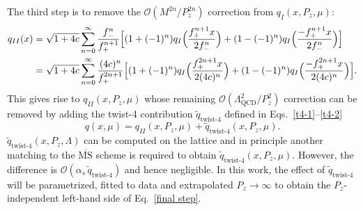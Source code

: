 The third step is to remove the $\mathcal{O}(M^{2n}/P_z^{2n})$
correction from $q_I (x,P_z,\mu)$:
%
\begin{align}
q_{II}(x)&=\sqrt{1+4c}\sum_{n=0}^\infty \frac{f_-^n}{f_+^{n+1}}\Big[(1+(-1)^n) q_I\Big(\frac{f_+^{n+1}x}{2f_-^n}\Big)+(1-(-1)^n)q_{I}\Big(\frac{-f_+^{n+1}x}{2f_-^n}\Big)\Big]\nonumber\\
&=\sqrt{1+4c}\sum_{n=0}^\infty \frac{(4c)^n}{f_+^{2n+1}}\Big[(1+(-1)^n) q_I\Big(\frac{f_+^{2n+1}x}{2(4c)^n}\Big)+(1-(-1)^n) q_I\Big(\frac{-f_+^{2n+1}x}{2(4c)^n}\Big)\Big].
\end{align}
%
This gives rise to $q_{II}(x,P_z,\mu)$ whose remaining
$\mathcal{O}\left(\Lambda_\text{QCD}^2/P_z^2\right)$ correction can be removed by
adding the twist-4 contribution $\tilde{q}_\text{twist-4}$ defined in
Eqs.~\ref{t4-1}--\ref{t4-2}
%
\begin{equation}
q(x,\mu) = q_{II}(x,P_z,\mu) + \tilde{q}_\text{twist-4}(x,P_z,\mu).
\label{final step}
\end{equation}
%
$\tilde{q}_\text{twist-4}(x,P_z,\Lambda)$ can be computed on the lattice and in
principle another matching to the $\overline{\text{MS}}$ scheme is
required to obtain $\tilde{q}_\text{twist-4}(x,P_z,\mu)$. However, the difference
is $\mathcal{O}\left(\alpha_s\,\tilde{q}_\text{twist-4}\right)$ and hence negligible. In this work, the effect of $\tilde{q}_\text{twist-4}$ will be
parametrized, fitted to data and extrapolated $P_z \to \infty$ to obtain the $P_z$-independent left-hand side of
Eq.~\ref{final step}.
